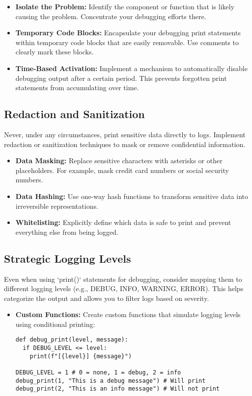 \documentclass{article}
\begin{document}
\begin{itemize}
    \item \textbf{Isolate the Problem:} Identify the component or function that is likely causing the problem.  Concentrate your debugging efforts there.
    \item \textbf{Temporary Code Blocks:}  Encapsulate your debugging print statements within temporary code blocks that are easily removable.  Use comments to clearly mark these blocks.
    \item \textbf{Time-Based Activation:}  Implement a mechanism to automatically disable debugging output after a certain period.  This prevents forgotten print statements from accumulating over time.
\end{itemize}

\subsection*{Redaction and Sanitization}

Never, under any circumstances, print sensitive data directly to logs. Implement redaction or sanitization techniques to mask or remove confidential information.

\begin{itemize}
    \item \textbf{Data Masking:} Replace sensitive characters with asterisks or other placeholders.  For example, mask credit card numbers or social security numbers.
    \item \textbf{Data Hashing:}  Use one-way hash functions to transform sensitive data into irreversible representations.
    \item \textbf{Whitelisting:}  Explicitly define which data is safe to print and prevent everything else from being logged.
\end{itemize}

\subsection*{Strategic Logging Levels}

Even when using `print()` statements for debugging, consider mapping them to different logging levels (e.g., DEBUG, INFO, WARNING, ERROR). This helps categorize the output and allows you to filter logs based on severity.

\begin{itemize}
    \item \textbf{Custom Functions:} Create custom functions that simulate logging levels using conditional printing:

\begin{verbatim}
def debug_print(level, message):
  if DEBUG_LEVEL <= level:
    print(f"[{level}] {message}")

DEBUG_LEVEL = 1 # 0 = none, 1 = debug, 2 = info
debug_print(1, "This is a debug message") # Will print
debug_print(2, "This is an info message") # Will not print
\end{verbatim}
\end{itemize}
\end{document}
